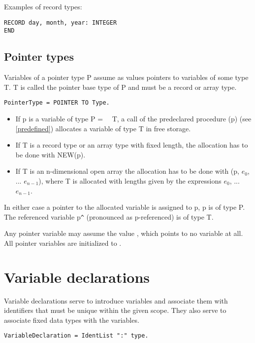 \documentclass[12pt]{article}
\begin{document}
Examples of record types:
\begin{lstlisting}[style=example]
RECORD day, month, year: INTEGER 
END
\end{lstlisting}

\subsection{Pointer types}
\label{pointers}

Variables of a pointer type P assume as values pointers to variables of some type T. T is called the pointer base type of P and must be a record or array type.

\begin{lstlisting}[style=ebnf]
PointerType = POINTER TO Type.
\end{lstlisting}

\begin{itemize}
    \item If p is a variable of type P = \POINTER\ \TO\ T, a call of the predeclared procedure \NEW(p) (see \ref{predefined}) allocates a variable of type T in free storage. 
    \item If T is a record type or an array type with fixed length, the allocation has to be done with NEW(p).
    \item If T is an n-dimensional open array the allocation has to be done with \NEW(p, $e_0$, ... $e_{n-1}$), where T is allocated with lengths given by the expressions $e_0$, ... $e_{n-1}$.
\end{itemize}
In either case a pointer to the allocated variable is assigned to p, p is of type P. The referenced variable p\lstinline!^! (pronounced as p-referenced) is of type T.

Any pointer variable may assume the value \NIL, which points to no variable at all. All pointer variables are initialized to \NIL.

\section{Variable declarations}

Variable declarations serve to introduce variables and associate them with identifiers that must be unique within the given scope. They also serve to associate fixed data types with the variables.

\begin{lstlisting}[style=ebnf]
VariableDeclaration = IdentList ":" type.
\end{lstlisting}
\end{document}
